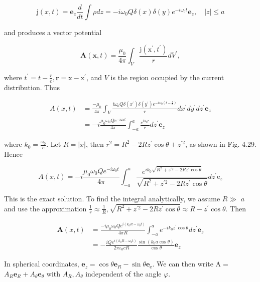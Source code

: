 \documentclass[10pt]{article}
\begin{document}
$$
\mathrm{j}(x, t)=\mathbf{e}_{z} \frac{d}{d t} \int \rho d z=-i \omega_{0} Q \delta(x) \delta(y) e^{-i \omega_{0} t} \mathbf{e}_{z}, \quad|z| \leq a
$$

and produces a vector potential

$$
\mathbf{A}(\mathbf{x}, t)=\frac{\mu_{0}}{4 \pi} \int_{V} \frac{\mathrm{j}\left(\mathrm{x}^{\prime}, t^{\prime}\right)}{r} d V^{\prime},
$$

where $t^{\prime}=t-\frac{r}{c}, \mathbf{r}=\mathrm{x}-\mathrm{x}^{\prime}$, and $V$ is the region occupied by the current distribution. Thus

$$
\begin{aligned}
A(x, t) &=\frac{-\mu_{0}}{4 \pi} \int_{V} \frac{i \omega_{0} Q \delta\left(x^{\prime}\right) \delta\left(y^{\prime}\right) e^{-i \omega_{0}\left(t-\frac{r}{c}\right)}}{r} d x^{\prime} d y^{\prime} d z^{\prime} \mathbf{e}_{z} \\
&=-i \frac{\mu_{0} \omega_{0} Q e^{-i \omega_{0} t}}{4 \pi} \int_{-a}^{a} \frac{e^{i k_{0} r}}{r} d z^{\prime} \mathbf{e}_{z}
\end{aligned}
$$

where $k_{0}=\frac{\omega_{0}}{c}$. Let $R=|x|$, then $r^{2}=R^{2}-2 R z^{\prime} \cos \theta+z^{\prime 2}$, as shown in Fig. 4.29. Hence

$$
A(x, t)=-i \frac{\mu_{0} \omega_{0} Q e^{-i \omega_{0} t}}{4 \pi} \int_{-a}^{a} \frac{e^{i k_{0} \sqrt{R^{2}+z^{\prime 2}-2 R z^{\prime} \cos \theta}}}{\sqrt{R^{2}+z^{\prime 2}-2 R z^{\prime} \cos \theta}} d z^{\prime} \mathrm{e}_{z}
$$

This is the exact solution. To find the integral analytically, we assume $R \gg$ $a$ and use the approximation $\frac{1}{r} \approx \frac{1}{R}, \sqrt{R^{2}+z^{\prime 2}-2 R z^{\prime} \cos \theta} \approx R-z^{\prime} \cos \theta$. Then

$$
\begin{aligned}
\mathbf{A}(x, t) &=\frac{-i \mu_{0} \omega_{0} Q e^{i\left(k_{0} R-\omega_{0} t\right)}}{4 \pi R} \int_{-a}^{a} e^{-i k_{0} z^{\prime} \cos \theta} d z^{\prime} \mathbf{e}_{z} \\
&=-\frac{i Q e^{i\left(k_{0} R-\omega_{0} t\right)}}{2 \pi \varepsilon_{0} c R} \frac{\sin \left(k_{0} a \cos \theta\right)}{\cos \theta} \mathbf{e}_{z}
\end{aligned}
$$

In spherical coordinates, $\mathbf{e}_{z}=\cos \theta \mathbf{e}_{R}-\sin \theta \mathbf{e}_{\mathrm{e}}$. We can then write $\mathrm{A}=$ $A_{R} \mathbf{e}_{R}+A_{\theta} \mathbf{e}_{\theta}$ with $A_{R}, A_{\theta}$ independent of the angle $\varphi$.
\end{document}
